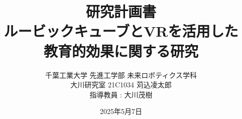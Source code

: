 \documentclass[uplatex,twocolumn]{jsarticle}
\begin{document}
 
\title{\large 研究計画書\\
\huge ルービックキューブとVRを活用した\\ 教育的効果に関する研究}
\author{千葉工業大学 先進工学部 未来ロボティクス学科\\
大川研究室 21C1034 苅込凌太郎\\
\small 指導教員 : 大川茂樹}
\date{2025年5月7日} 
\maketitle









\end{document}

